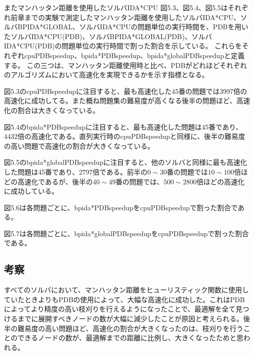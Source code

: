 \documentclass[a4paper,11pt,oneside,openany]{jsbook}
\begin{document}






またマンハッタン距離を使用したソルバIDA*CPU
図5.3、図5.4、図5.5はそれぞれ前章までの実験で測定したマンハッタン距離を使用したソルバIDA*CPU、ソルバBPIDA*GLOBAL、ソルバIDA*CPUの問題単位の実行時間を、PDBを用いたソルバIDA*CPU(PDB)、ソルバBPIDA*GLOBAL(PDB)、ソルバIDA*CPU(PDB)の問題単位の実行時間で割った割合を示している。
これらをそれぞれcpuPDBspeedup、bpida*PDBspeedup、bpida*globalPDBspeedupと定義する。
この三つは、マンハッタン距離使用時と比べ、PDBがどれほどそれぞれのアルゴリズムにおいて高速化を実現できるかを示す指標となる。

図5.3のcpuPDBspeedupに注目すると、最も高速化した45番の問題では3997倍の高速化に成功してる。また概ね問題集の難易度が高くなる後半の問題ほど、高速化の割合は大きくなっている。

図5.4のbpida*PDBspeedupに注目すると、最も高速化した問題は45番であり、4432倍の高速化である。直列実行時のcpuPDBspeedupと同様に、後半の難易度の高い問題で高速化の割合が大きくなっている。

図5.5のbpida*globalPDBspeedupに注目すると、他のソルバと同様に最も高速化した問題は45番であり、2797倍である。前半の$0\sim30$番の問題では$10\sim100$倍ほどの高速化であるが、後半の$40\sim49$番の問題では、$500\sim2800$倍ほどの高速化に成功している。


図5.6は各問題ごとに、bpida*PDBspeedupをcpuPDBspeedupで割った割合である。

図5.7は各問題ごとに、bpida*globalPDBspeedupをcpuPDBspeedupで割った割合である。




\subsection{考察}
すべてのソルバにおいて、マンハッタン距離をヒューリスティック関数に使用していたときよりもPDBの使用によって、大幅な高速化に成功した。これはPDBによってより精度の高い枝刈りを行えるようになったことで、最適解を全て見つけるまでに展開すべきノードの数が大幅に減少したことが原因と考えられる。後半の難易度の高い問題ほど、高速化の割合が大きくなったのは、枝刈りを行うことのできるノードの数が、最適解までの距離に比例し、大きくなったためと思われる。
\end{document}
